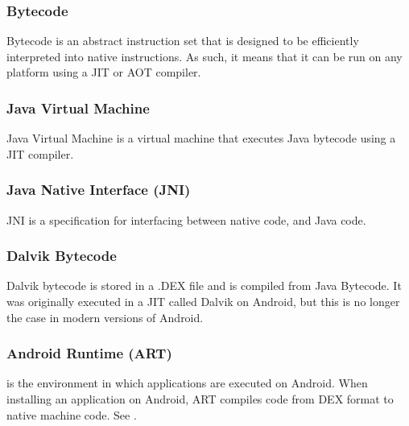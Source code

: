         \subsubsection{Bytecode} Bytecode is an abstract instruction set that is designed to be efficiently interpreted into native instructions. As such, it means that it can be run on any platform using a JIT or AOT compiler.
        \subsubsection{Java Virtual Machine} Java Virtual Machine is a virtual machine that executes Java bytecode using a JIT compiler.
        \subsubsection{Java Native Interface (JNI)} JNI is a specification for interfacing between native code, and Java code.
        \subsubsection{Dalvik Bytecode} Dalvik bytecode is stored in a .DEX file and is compiled from Java Bytecode. It was originally executed in a JIT called Dalvik on Android, but this is no longer the case in modern versions of Android. 
        \subsubsection{Android Runtime (ART)} is the environment in which applications are executed on Android. When installing an application on Android, ART compiles code from DEX format to native machine code. See \cite{androidart}.

